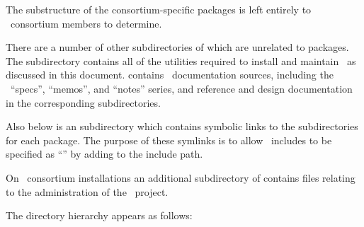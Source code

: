 The substructure of the consortium-specific packages is left entirely to
\aipspp\ consortium members to determine.

There are a number of other subdirectories of  which are
unrelated to packages.  The  subdirectory contains all of the
utilities required to install and maintain \aipspp\ as discussed in this
document.   contains \aipspp\ documentation sources, including the
\aipspp\ ``specs'', ``memos'', and ``notes'' series, and reference and design
documentation in the corresponding subdirectories.

Also below  is an  subdirectory which
contains symbolic links to the  subdirectories for each
package.  The purpose of these symlinks is to allow \aipspp\ includes to be
specified as ``'' by adding
\mbox{} to the include path.

On \aipspp\ consortium installations an additional  subdirectory
of  contains files relating to the administration of the
\aipspp\ project.

The  directory hierarchy appears as follows:

